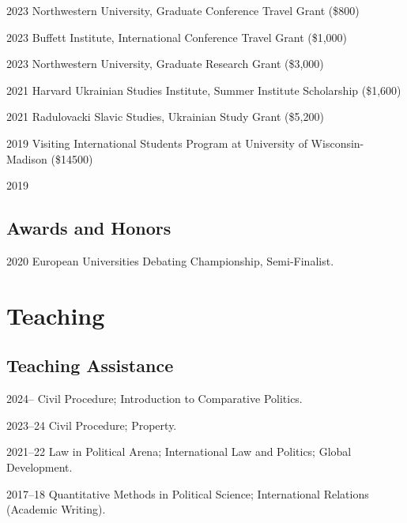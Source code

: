 \documentclass[11pt,letterpaper]{report}
\begin{document}
    \begin{tablist}


        \item[2023] \tab{}Northwestern University, Graduate Conference Travel Grant (\$800)
        \item[2023] \tab{}Buffett Institute, International Conference Travel Grant (\$1,000)
        \item[2023] \tab{}Northwestern University, Graduate Research Grant (\$3,000)
        \item[2021] \tab{}Harvard Ukrainian Studies Institute, Summer Institute Scholarship (\$1,600)
        \item[2021] \tab{}Radulovacki Slavic Studies, Ukrainian Study Grant (\$5,200)
        \item[2019] \tab{}Visiting International Students Program at University of Wisconsin-Madison (\$14500)
        \item[2019]  

    \end{tablist}

    \subsection*{Awards and Honors}

    \begin{tablist}

        \item[2020] \tab{}European Universities Debating Championship, Semi-Finalist. 
    \end{tablist}

    \section*{Teaching}

    \subsection*{Teaching Assistance}

    \begin{tablist}
        

        
        \item[2024--]      \tab{}Civil Procedure; Introduction to Comparative Politics.
        \item[2023--24]    \tab{}Civil Procedure; Property.
        \item[2021--22]    \tab{}Law in Political Arena; International Law and Politics; Global Development.
        \item[2017--18]    \tab{}Quantitative Methods in Political Science; International Relations (Academic Writing).

    \end{tablist}
\end{document}
